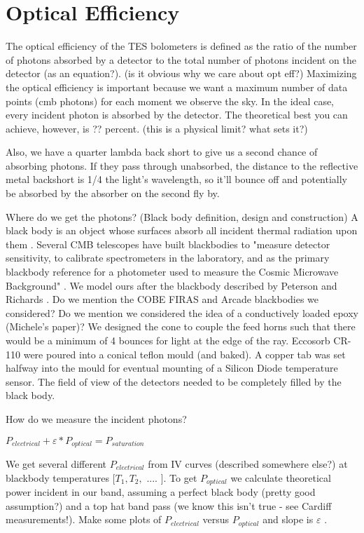 \section{Optical Efficiency}
\label{optical_efficiency_section}

The optical efficiency of the TES bolometers is defined as the ratio of the number of photons absorbed by a detector to the total number of photons incident on the detector (as an equation?). (is it obvious why we care about opt eff?) Maximizing the optical efficiency is important because we want a maximum number of data points (cmb photons) for each moment we observe the sky.  
In the ideal case, every incident photon is absorbed by the detector. The theoretical best you can achieve, however, is ?? percent. (this is a physical limit? what sets it?)

Also, we have a quarter lambda back short to give us a second chance of absorbing photons. If they pass through unabsorbed, the distance to the reflective metal backshort is 1/4 the light's wavelength, so it'll bounce off and potentially be absorbed by the absorber on the second fly by. 

Where do we get the photons? (Black body definition, design and construction)
A black body is an object whose surfaces absorb all incident thermal radiation upon them \cite{Eisberg}. Several CMB telescopes have built blackbodies \cite{} to "measure detector sensitivity, to calibrate spectrometers in the laboratory, and as the primary blackbody reference for a photometer used to measure the Cosmic Microwave Background" \cite{Peterson1984a}. We model ours after the blackbody described by Peterson and Richards \cite{Peterson1984a}. Do we mention the COBE FIRAS and Arcade blackbodies we considered? Do we mention we considered the idea of a conductively loaded epoxy (Michele's paper)? 
We designed the cone to couple the feed horns such that there would be a minimum of 4 bounces for light at the edge of the ray.
Eccosorb CR-110 were poured into a conical teflon mould (and baked). A copper tab was set halfway into the mould for eventual mounting of a Silicon Diode temperature sensor. 
The field of view of the detectors needed to be completely filled by the black body. 

How do we measure the incident photons?

$P_{electrical} + \varepsilon*P_{optical} = P_{saturation}$

We get several different $P_{electrical}$ from IV curves (described somewhere else?) at blackbody  temperatures [$T_{1}, T_{2},$ .... ]. To get $P_{optical}$ we calculate theoretical power incident in our band, assuming a perfect black body (pretty good assumption?) and a top hat band pass (we know this isn't true - see Cardiff measurements!). Make some plots of $P_{electrical}$  versus $P_{optical}$ and slope is $\varepsilon$ .



